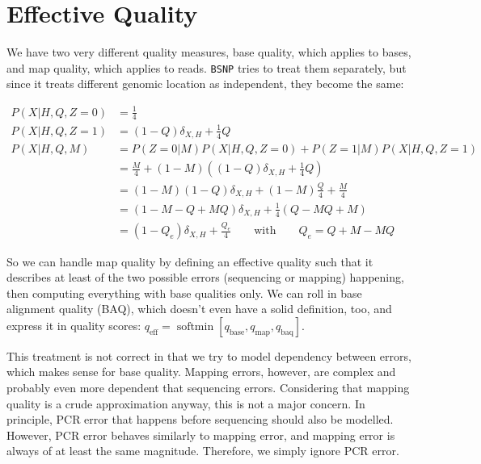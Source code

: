 \documentclass{article}
\begin{document}
\section{Effective Quality}
\label{app_qualities}

We have two very different quality measures, base quality, which applies to bases, and map quality, which applies to reads.
\texttt{BSNP} tries to treat them separately, but since it treats different genomic location as independent, they become the same:

\begin{align*}
P(X|H,Q,Z=0) &= \frac{1}{4} \\
P(X|H,Q,Z=1) &= (1-Q)\delta_{X,H} + \frac{1}{4}Q \\
P(X|H,Q,M) &= P(Z=0|M) P(X|H,Q,Z=0) + P(Z=1|M) P(X|H,Q,Z=1) \\
&= \frac{M}{4} + (1-M)\left((1-Q)\delta_{X,H} + \frac{1}{4}Q \right) \\
&= (1-M)(1-Q)\delta_{X,H} + (1-M)\frac{Q}{4} + \frac{M}{4} \\
&= (1-M-Q+MQ) \delta_{X,H} + \frac{1}{4}(Q-MQ+M) \\
&= (1-Q_e) \delta_{X,H} + \frac{Q_e}{4} \qquad \mbox{with} \qquad Q_e = Q+M-MQ
\end{align*}

So we can handle map quality by defining an effective quality such that it describes at least of the two possible errors (sequencing
or mapping) happening, then computing everything with base qualities only.  We can roll in base alignment quality (BAQ), which
doesn't even have a solid definition, too, and express it in quality scores: $q_{\operatorname{eff}} = \operatorname{softmin} \left[
q_{\operatorname{base}}, q_{\operatorname{map}}, q_{\operatorname{baq}} \right]$. 

This treatment is not correct in that we try to model dependency between errors, which makes sense for base quality.  Mapping
errors, however, are complex and probably even more dependent that sequencing errors.  Considering that mapping quality is a crude
approximation anyway, this is not a major concern.  In principle, PCR
error that happens before sequencing should also be modelled.  However,
PCR error behaves similarly to mapping error, and mapping error is
always of at least the same magnitude.  Therefore, we simply ignore PCR
error.

\listoftodos
\end{document}
